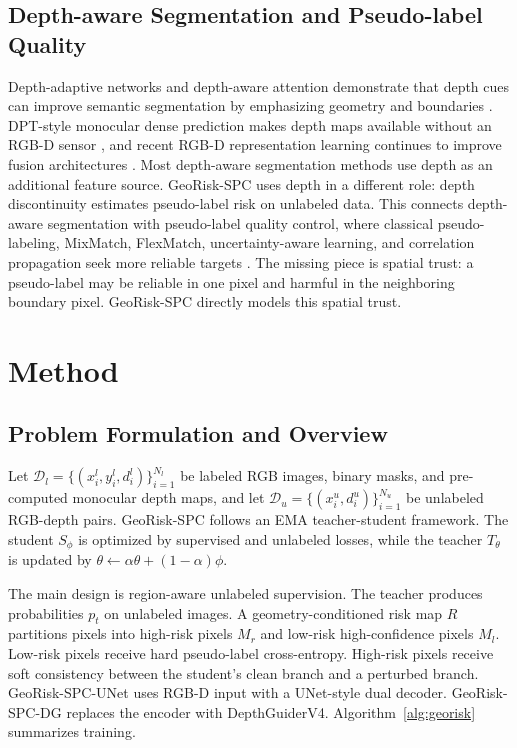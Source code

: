 \documentclass[journal]{IEEEtran}
\begin{document}
\subsection{Depth-aware Segmentation and Pseudo-label Quality}
Depth-adaptive networks and depth-aware attention demonstrate that depth cues can improve semantic segmentation by emphasizing geometry and boundaries \cite{mi2017depth,zhu2020depth}. DPT-style monocular dense prediction makes depth maps available without an RGB-D sensor \cite{ranftl2021vision}, and recent RGB-D representation learning continues to improve fusion architectures \cite{yin2026dformer}. Most depth-aware segmentation methods use depth as an additional feature source. GeoRisk-SPC uses depth in a different role: depth discontinuity estimates pseudo-label risk on unlabeled data. This connects depth-aware segmentation with pseudo-label quality control, where classical pseudo-labeling, MixMatch, FlexMatch, uncertainty-aware learning, and correlation propagation seek more reliable targets \cite{lee2013pseudo,berthelot2019mixmatch,zhang2021flexmatch,yu2019uncertainty,sun2024corrmatch}. The missing piece is spatial trust: a pseudo-label may be reliable in one pixel and harmful in the neighboring boundary pixel. GeoRisk-SPC directly models this spatial trust.

\section{Method}
\subsection{Problem Formulation and Overview}
Let $\mathcal{D}_l=\{(x_i^l,y_i^l,d_i^l)\}_{i=1}^{N_l}$ be labeled RGB images, binary masks, and pre-computed monocular depth maps, and let $\mathcal{D}_u=\{(x_i^u,d_i^u)\}_{i=1}^{N_u}$ be unlabeled RGB-depth pairs. GeoRisk-SPC follows an EMA teacher-student framework. The student $S_\phi$ is optimized by supervised and unlabeled losses, while the teacher $T_\theta$ is updated by $\theta\leftarrow\alpha\theta+(1-\alpha)\phi$.

The main design is region-aware unlabeled supervision. The teacher produces probabilities $p_t$ on unlabeled images. A geometry-conditioned risk map $R$ partitions pixels into high-risk pixels $M_r$ and low-risk high-confidence pixels $M_l$. Low-risk pixels receive hard pseudo-label cross-entropy. High-risk pixels receive soft consistency between the student's clean branch and a perturbed branch. GeoRisk-SPC-UNet uses RGB-D input with a UNet-style \cite{ronneberger2015u} dual decoder. GeoRisk-SPC-DG replaces the encoder with DepthGuiderV4. Algorithm~\ref{alg:georisk} summarizes training.
\end{document}
